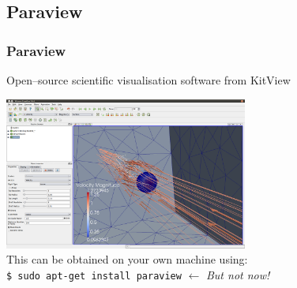 \documentclass[12pt]{beamer}
\begin{document}
\subsection{Paraview}
\begin{frame}
    \frametitle{Paraview}
Open--source scientific visualisation software from KitView
\begin{center}
\includegraphics[width=0.6\textwidth]{images/paraview_example.png}\\
\vspace{5mm}
This can be obtained on your own machine using:\\
{\tt \$ sudo apt-get install paraview} $\leftarrow$ \emph{\color{red}But not now!}
\end{center}
\end{frame}
\end{document}
